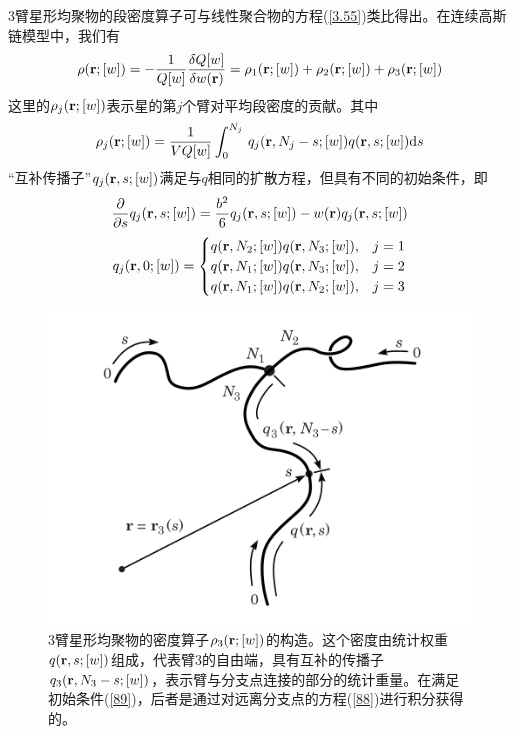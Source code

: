 $3$臂星形均聚物的段密度算子可与线性聚合物的方程(\ref{3.55})类比得出。在连续高斯链模型中，我们有
\begin{equation}
\rho(\mathbf{r};[w])=-\frac{1}{Q[w]}\frac{\delta Q[w]}{\delta w(\mathbf{r})}=\rho _1(\mathbf{r};[w])+\rho _2(\mathbf{r};[w])+\rho _3(\mathbf{r};[w])
\end{equation}
这里的$\rho _j(\mathbf{r};[w])$表示星的第$j$个臂对平均段密度的贡献。其中
\begin{equation}
\rho _{j}(\mathbf{r};[w])=\frac{1}{VQ[w]} \int_{0}^{N_j}\,q_{j}(\mathbf{r},N_{j}-s;[w])q(\mathbf{r},s;[w]) \mathrm{d}s \label{87}
\end{equation}
“互补传播子”$q_{j}(\mathbf{r},s;[w])$满足与$q$相同的扩散方程，但具有不同的初始条件，即
\begin{equation}
\frac{\partial}{\partial s}q_j(\mathbf{r},s;[w])=\frac{b^2}{6}q_j(\mathbf{r},s;[w])-w(\mathbf{r})q_j(\mathbf{r},s;[w]) \label{88}
\end{equation}
\begin{equation}
q_j(\mathbf{r},0;[w])=
\begin{cases}
q(\mathbf{r},N_2;[w])q(\mathbf{r},N_3;[w]), & j=1 \\
q(\mathbf{r},N_1;[w])q(\mathbf{r},N_3;[w]), & j=2 \\
q(\mathbf{r},N_1;[w])q(\mathbf{r},N_2;[w]), & j=3  \label{89}
\end{cases}
\end{equation}

\begin{figure}[H]
\centering
\includegraphics[scale=0.7]{Contents/chapter3/figures/35.png}
\caption{$3$臂星形均聚物的密度算子$\rho _3(\mathbf{r};[w])$的构造。这个密度由统计权重$q(\mathbf{r},s;[w])$组成，代表臂$3$的自由端，具有互补的传播子$q_3(\mathbf{r},N_3-s;[w])$，表示臂与分支点连接的部分的统计重量。在满足初始条件(\ref{89})，后者是通过对远离分支点的方程(\ref{88})进行积分获得的。}
\label{三臂星形图像}
\end{figure}

